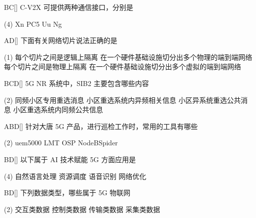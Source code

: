\begin{choice}{\;BC\;}[]
    C-V2X 可提供两种通信接口，分别是
    \begin{tasks}(4)
        \task Xn
        \task PC5
        \task Uu
        \task Ng
    \end{tasks}
\end{choice}


\begin{choice}{\;AD\;}[]
    下面有关网络切片说法正确的是
    \begin{tasks}(1)
        \task 每个切片之间是逻辑上隔离
        \task 在一个硬件基础设施切分出多个物理的端到端网络
        \task 每个切片之间是物理上隔离
        \task 在一个硬件基础设施切分出多个虚拟的端到端网络
    \end{tasks}
\end{choice}

\begin{choice}{\;BCD\;}[]
    5G NR 系统中，SIB2 主要包含哪些内容
    \begin{tasks}(2)
        \task 同频小区专用重选消息
        \task 小区重选系统内异频相关信息
        \task 小区异系统重选公共消息
        \task 小区重选系统内同频公共信息
    \end{tasks}
\end{choice}

\begin{choice}{\;ABD\;}[]
    针对大唐 5G 产品，进行巡检工作时，常用的工具有哪些
    \begin{tasks}(2)
        \task uem5000
        \task LMT
        \task  OSP
        \task NodeBSpider
    \end{tasks}
\end{choice}

\begin{choice}{\;BD\;}[]
    以下属于 AI 技术赋能 5G 方面应用是
    \begin{tasks}(4)
        \task 自然语言处理
        \task 资源调度
        \task 语音识别
        \task 网络优化
    \end{tasks}
\end{choice}

\begin{choice}{\;BD\;}[]
    下列数据类型，哪些属于 5G 物联网
    \begin{tasks}(2)
        \task 交互类数据
        \task 控制类数据
        \task  传输类数据
        \task 采集类数据
    \end{tasks}
\end{choice}

